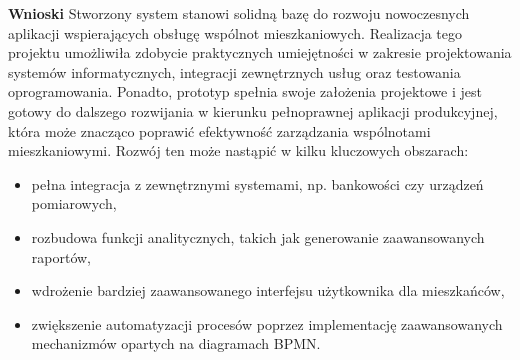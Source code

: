 \noindent\textbf{Wnioski}\newline
Stworzony system stanowi solidną bazę do rozwoju nowoczesnych aplikacji wspierających obsługę wspólnot mieszkaniowych. Realizacja tego projektu umożliwiła zdobycie praktycznych umiejętności w zakresie projektowania systemów informatycznych, integracji zewnętrznych usług oraz testowania oprogramowania. Ponadto, prototyp spełnia swoje założenia projektowe i jest gotowy do dalszego rozwijania w kierunku pełnoprawnej aplikacji produkcyjnej, która może znacząco poprawić efektywność zarządzania wspólnotami mieszkaniowymi. Rozwój ten może nastąpić w kilku kluczowych obszarach:
\begin{itemize}
    \item pełna integracja z zewnętrznymi systemami, np. bankowości czy urządzeń pomiarowych,
    \item rozbudowa funkcji analitycznych, takich jak generowanie zaawansowanych raportów,
    \item wdrożenie bardziej zaawansowanego interfejsu użytkownika dla mieszkańców,
    \item zwiększenie automatyzacji procesów poprzez implementację zaawansowanych mechanizmów opartych na diagramach BPMN.
\end{itemize}


